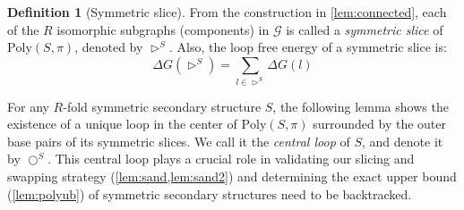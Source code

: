 \documentclass[11pt,letterpaper]{article}  \usepackage[margin=1in]{geometry}
\theoremstyle{definition}  \newtheorem{Definition}[theorem]{Definition}
\newcommand{\PolySpi}{\ensuremath{\mathrm{Poly}(S,\pi)}\xspace}
\begin{document}
\begin{Definition}[Symmetric slice]\label{def:symmetric slice}
	From the construction in \cref{lem:connected}, each of the $R$ 
	isomorphic subgraphs (components) in $ \mathcal{G}$ is called a {\em symmetric slice} of $\PolySpi$,  denoted  by $\rhd^{S}$. Also, the loop free energy of a symmetric slice is: 
	\begin{equation}
		\Delta G(\rhd^{S}) = \sum_{l\in \rhd^{S}} \Delta G(l)
	\end{equation}
\end{Definition}

For any $R$-fold symmetric secondary structure $S$, the following lemma shows the existence of a unique loop in the center of $\PolySpi$  surrounded by the outer base pairs of its symmetric slices. We call it the {\em central loop} of $S$, and denote it by $\bigcirc^S$. This central loop plays a crucial role in validating our slicing and swapping strategy  (\cref{lem:sand,lem:sand2}) and determining the exact upper bound (\cref{lem:polyub}) of symmetric secondary structures need to be backtracked.  
\end{document}
